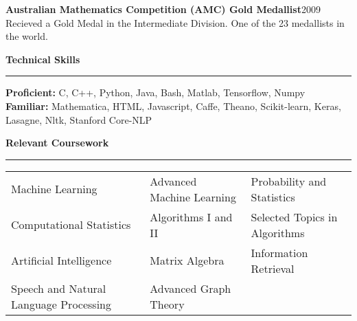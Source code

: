 \documentclass[10pt]{article}
\newcommand{\heading}[1]{
 {\large \textbf{#1}}
  \vspace{0.4em}
  \hrule
  \vspace{0.4em}
}
\newcommand{\EntryGap}{\vspace{0.4	cm}}
\newcommand{\SmallEntryGap}{\vspace{0.2cm}}
\newcommand{\mdot}{$\ \ \cdot\ \ $}
\begin{document}
 \textbf{Australian Mathematics Competition (AMC) Gold Medallist}\hfill 2009\\
  Recieved a Gold Medal in the Intermediate Division. One of the 23 medallists in the world.




\EntryGap
\heading{Technical Skills}
\SmallEntryGap
\textbf{Proficient:} C, C++, Python, Java, Bash, Matlab, Tensorflow, Numpy\\
\textbf{Familiar:} Mathematica, HTML, Javascript, Caffe, Theano, Scikit-learn,
Keras, Lasagne, Nltk, Stanford Core-NLP





\EntryGap
\heading{Relevant Coursework}

\SmallEntryGap
\begin{tabular}{lll}
 Machine Learning & Advanced Machine Learning & Probability and Statistics\\
 Computational Statistics & Algorithms I and II & Selected Topics in Algorithms\\
 Artificial Intelligence & Matrix Algebra & Information Retrieval\\
 Speech and Natural Language Processing & Advanced Graph Theory
\end{tabular}

\end{document}
